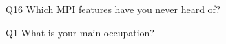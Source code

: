 \begin{description}%
\item{Q16} Which MPI features have you never heard of?%
\item{Q1} What is your main occupation?%
\end{description}%
